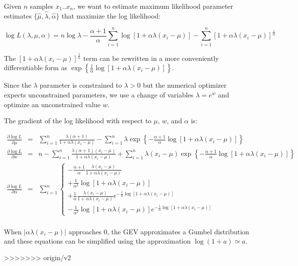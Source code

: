 Given $n$ samples $x_1..x_n$, we want to estimate maximum likelihood
parameter estimates $\{ \hat{\mu}, \hat{\lambda}, \hat{\alpha} \}$
that maximize the log likelihood:

\begin{equation}
\log L(\lambda, \mu, \alpha) = n \log \lambda 
       - \frac{\alpha+1}{\alpha} 
           \sum_{i=1}^{n} \log\left[1+ \alpha\lambda(x_i - \mu) \right]
       - \sum_{i=1}^{n} \left[ 1 + \alpha\lambda (x_i - \mu) \right]^{\frac{1}{\alpha}}
\label{eqn:gev_logL}
\end{equation}

The $\left[ 1 + \alpha\lambda (x_i - \mu) \right]^{\frac{1}{\alpha}}$
term can be rewritten in a more conveniently differentiable form as
$\exp \left\{ \frac{1}{\alpha} \log \left[ 1 + \alpha\lambda (x_i - \mu)
\right] \right\}$.

Since the $\lambda$ parameter is constrained to $\lambda > 0$ but the
numerical optimizer expects unconstrained parameters, we use a change
of variables $\lambda = e^w$ and optimize an unconstrained value $w$.

The gradient of the log likelihood with respect to $\mu$, $w$, and
$\alpha$ is:

\begin{eqnarray}
\frac{\partial \log L}{\partial \mu} & = &
  \sum_{i=1}^n \frac{\lambda (\alpha+1)}{1+\alpha\lambda(x_i-\mu)} 
 -\sum_{i=1}^n \lambda \exp 
    \left\{ -\frac{\alpha+1}{\alpha} \log
          \left[1+\alpha\lambda(x_i-\mu)\right] \right\}
\\%
\label{eqn:gev_mupartial}
\frac{\partial \log L}{\partial w} & = &
  n - \sum_{i=1}^{n} \frac{\lambda (\alpha+1) (x_i - \mu)} 
                          {1 + \alpha \lambda (x_i - \mu)}
  + \sum_{i=1}^n \lambda (x_i - \mu) 
         \exp \left\{ -\frac{\alpha+1}{\alpha} \log
          \left[1+\alpha\lambda(x_i-\mu)\right] \right\}
\\%
\label{eqn:gev_wpartial}
\frac{\partial \log L}{\partial \alpha} & = &
   \sum_{i=1}^n \left\{
      \begin{array}{l}
      - \frac{\alpha+1}{\alpha} \frac{\lambda(x_i-\mu)}
                                  {1 +\alpha\lambda(x_i-\mu)}\\
      + \frac{1}{\alpha^2} \log \left[ 1 + \alpha\lambda(x_i - \mu) \right]\\
      + \frac{1}{\alpha} \frac{\lambda(x_i-\mu)}
                          {1 +\alpha\lambda(x_i-\mu)}
      e^{-\frac{1}{\alpha} \log\left[ 1 + \alpha\lambda(x_i - \mu) \right]}\\
     -  \frac{1}{\alpha^2} \log \left[ 1 + \alpha\lambda(x_i - \mu) \right]
      e^{-\frac{1}{\alpha} \log\left[ 1 + \alpha\lambda(x_i - \mu)
	 \right]} 
     \end{array}
     \right.
\\%
\label{eqn:gev_alphapartial}
\end{eqnarray}

When $|\alpha\lambda(x_i - \mu)|$ approaches $0$, the GEV approximates
a Gumbel distribution and these equations can be simplified using the
approximation $\log(1+a) \simeq a$.







>>>>>>> origin/v2
